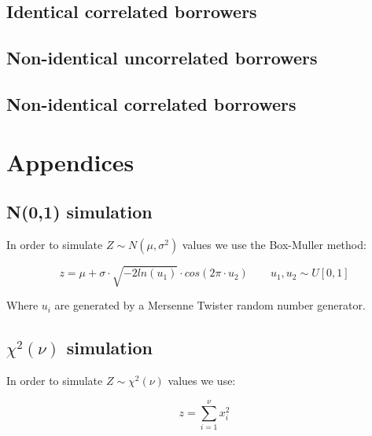 \documentclass[a4paper,12pt,final]{article}
\begin{document}
\subsection{Identical correlated borrowers}

\subsection{Non-identical uncorrelated borrowers}

\subsection{Non-identical correlated borrowers}


\appendix
\section{Appendices}

\subsection{N(0,1) simulation}
\label{ap:normsim}

In order to simulate $Z \sim N(\mu, \sigma^2)$ values we use the Box-Muller 
method:

\begin{displaymath}
z = \mu + \sigma\cdot \sqrt{-2 ln(u_1)} \cdot cos(2 \pi \cdot u_2)
\qquad u_1, u_2 \sim U[0,1]
\end{displaymath}

Where $u_i$ are generated by a Mersenne Twister random number generator.

\subsection{$\chi^2(\nu)$ simulation}
\label{ap:chi2sim}

In order to simulate $Z \sim \chi^2(\nu)$ values we use:

\begin{displaymath}
z = \sum_{i=1}^{\nu} x_i^2
\end{displaymath}
\end{document}
